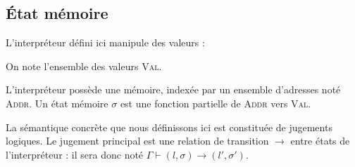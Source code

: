 
\subsection{État mémoire}
\label{sec:sigma}

L'interpréteur défini ici manipule des valeurs :


On note l'ensemble des valeurs \textsc{Val}.

\begin{definition}
L'interpréteur possède une mémoire, indexée par un ensemble d'adresses noté
\textsc{Addr}. Un état mémoire $σ$ est une fonction partielle de \textsc{Addr}
vers \textsc{Val}.
\end{definition}



\begin{definition}
La sémantique concrète que nous définissons ici est constituée de jugements
logiques. Le jugement principal est une relation de transition $\rightarrow$
entre états de l'interpréteur : il sera donc noté $Γ ⊢ (l, σ) \rightarrow (l', σ')$.
\end{definition}

